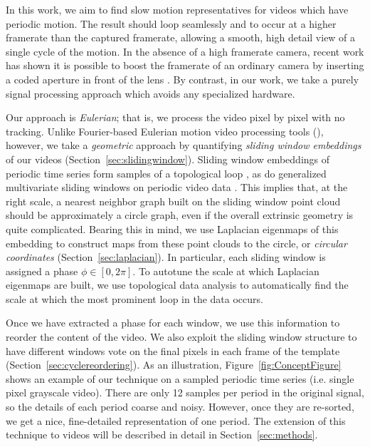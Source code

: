 \documentclass{article}
\begin{document}
In this work, we aim to find slow motion representatives for videos which have periodic motion.  The result should loop seamlessly and to occur at a higher framerate than the captured framerate, allowing a smooth, high detail view of a single cycle of the motion.  In the absence of a high framerate camera, recent work has shown it is possible to boost the framerate of an ordinary camera by inserting a coded aperture in front of the lens \cite{llull2013coded}.  By contrast, in our work, we take a purely signal processing approach which avoids any specialized hardware.


Our approach is {\em Eulerian}; that is, we process the video pixel by pixel with no tracking.  Unlike Fourier-based Eulerian motion video processing tools (\cite{wu2012eulerian, wadhwa2013phase}), however, we take a {\em geometric} approach by quantifying {\em sliding window embeddings} of our videos (Section~\ref{sec:slidingwindow}).  Sliding window embeddings of periodic time series form samples of a topological loop \cite{perea2015sliding}, as do generalized multivariate sliding windows on periodic video data \cite{traliehigh, tralie2017quasi}.  This implies that, at the right scale, a nearest neighbor graph built on the sliding window point cloud should be approximately a circle graph, even if the overall extrinsic geometry is quite complicated.  Bearing this in mind, we use Laplacian eigenmaps \cite{belkin2003laplacian} of this embedding to construct maps from these point clouds to the circle, or {\em circular coordinates} (Section~\ref{sec:laplacian}).  In particular, each sliding window is assigned a phase $\phi \in [0, 2\pi]$.  To autotune the scale at which Laplacian eigenmaps are built, we use topological data analysis \cite{edelsbrunner2000topological,edelsbrunner2008persistent,edelsbrunner2010computational,carlsson2009topology,ghrist2014elementary} to automatically find the scale at which the most prominent loop in the data occurs.

Once we have extracted a phase for each window, we use this information to reorder the content of the video.  We also exploit the sliding window structure to have different windows vote on the final pixels in each frame of the template (Section~\ref{sec:cyclereordering}).  As an illustration, Figure~\ref{fig:ConceptFigure} shows an example of our technique on a sampled periodic time series (i.e. single pixel grayscale video).  There are only 12 samples per period in the original signal, so the details of each period coarse and noisy.  However, once they are re-sorted, we get a nice, fine-detailed representation of one period.  The extension of this technique to videos will be described in detail in Section~\ref{sec:methods}.
\end{document}
